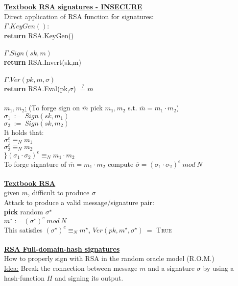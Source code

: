 \documentclass{report}
\begin{document}
	\underline{\textbf{Textbook RSA signatures - INSECURE}} \\
	Direct application of RSA function for signatures: \\
	$\Gamma.KeyGen()$: \\
	\textbf{return} RSA.KeyGen() \\
	\\
	$\Gamma.Sign(sk,m)$ \\
	\textbf{return} RSA.Invert(sk,m) \\
	\\
	$\Gamma.Ver(pk, m, \sigma)$ \\
	\textbf{return} RSA.Eval(pk,$\sigma$) $\stackrel{?}{=} m$ \\
	\\ 
	\underline{$m_1, m_2$:} (To forge sign on $\overline{m}$ pick $m_1, m_2$ s.t. $\overline{m} = m_1 \cdot m_2$) \\
	$\sigma_1 \ := \ Sign(sk, m_1)$ \\
	$\sigma_2 \ := \ Sign(sk, m_2)$ \\
	It holds that: \\
	$\sigma_1^e \equiv_N m_1$ \\
	$\sigma_2^e \equiv_N m_2$ \\
	$\} (\sigma_1 \cdot \sigma_2)^e \equiv_N m_1 \cdot m_2$ \\
	To forge signature of $\overline{m} = m_1 \cdot m_2$ compute $\overline{\sigma} = (\sigma_1 \cdot \sigma_2)^e \ mod \ N$ \\
	\\
	\underline{\textbf{Textbook RSA}} \\
	given $m$, difficult to produce $\sigma$ \\
	Attack to produce a valid message/signature pair: \\
	\textbf{pick} random $\sigma^{\star}$ \\
	$m^{\star} := (\sigma^{\star})^{e} \ mod \ N$ \\
	This satisfies $(\sigma^{\star})^{e} \equiv_N m^{\star}$, $Ver(pk, m^{\star}, \sigma^{\star}) \ =$ \textsc{True} \\
	\\
	\underline{\textbf{RSA Full-domain-hash signatures}} \\
	How to properly sign with RSA in the random oracle model (R.O.M.) \\
	\underline{Idea:} Break the connection between message $m$ and a signature $\sigma$ by using a hash-function $H$ and signing its output. \\
\end{document}
